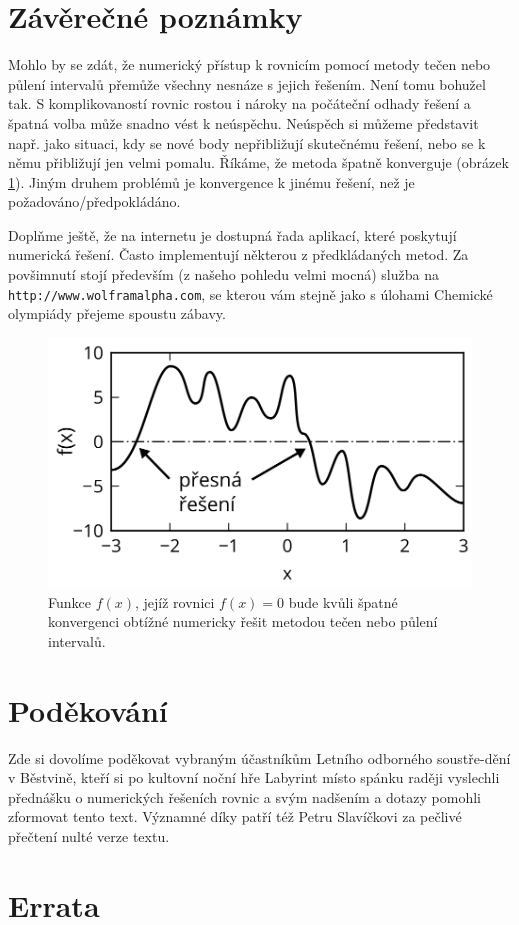 \documentclass[a4paper,oneside,12pt]{article}
\begin{document}
\section{Závěrečné poznámky}

Mohlo by se zdát, že numerický přístup k rovnicím pomocí metody tečen
nebo půlení intervalů přemůže všechny nesnáze s jejich řešením.
Není tomu bohužel tak. S komplikovaností rovnic rostou i nároky 
na počáteční odhady řešení a špatná volba může snadno vést k neúspěchu.
Neúspěch si můžeme představit např. jako situaci, kdy se nové body
nepřibližují skutečnému řešení, nebo se k němu přibližují jen velmi pomalu.
Říkáme, že metoda špatně konverguje (obrázek \ref{fig:konverg}).
Jiným druhem problémů je konvergence k jinému řešení, než je 
požadováno/předpokládáno.

Doplňme ještě, že na internetu je dostupná řada aplikací, které
poskytují numerická řešení. Často implementují některou z předkládaných
metod. Za povšimnutí stojí především (z našeho pohledu velmi mocná) 
služba na \texttt{http://www.wolframalpha.com}, se kterou vám stejně
jako s úlohami Chemické olympiády přejeme spoustu zábavy.

\begin{figure}
\begin{center}
\includegraphics{./IMGS/konverg-drawing.png}
\end{center}
\caption{Funkce $f(x)$, jejíž rovnici $f(x) = 0$ bude kvůli špatné
konvergenci obtížné numericky řešit metodou tečen nebo půlení intervalů.}
\label{fig:konverg}
\end{figure}

\section*{Poděkování}

Zde si dovolíme poděkovat vybraným účastníkům Letního odborného
soustře-dění v Běstvině, kteří si po kultovní noční hře Labyrint
místo spánku raději vyslechli přednášku o numerických řešeních
rovnic a svým nadšením a dotazy pomohli zformovat tento text. 
Významné díky patří též Petru Slavíčkovi za pečlivé přečtení 
nulté verze textu.

\section*{Errata}
\end{document}
